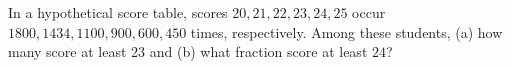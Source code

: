 In a hypothetical score table, scores $20,21,22,23,24,25$ occur $1800,1434,1100,900,600,450$ times, respectively. Among these students, (a) how many score at least $23$ and (b) what fraction score at least $24$?

